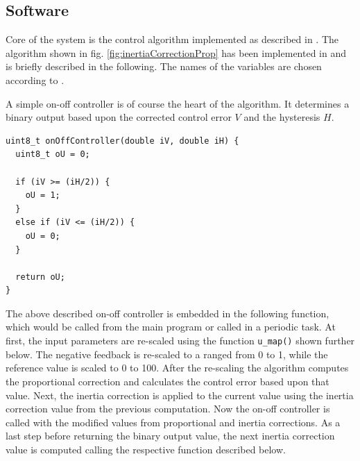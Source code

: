 \subsection{Software}
\label{subsec:etching_tank_sw}
Core of the system is the control algorithm implemented as described in \cite{article:onoffPLC}. The algorithm shown in fig. \ref{fig:inertiaCorrectionProp} has been implemented in  and is briefly described in the following. The names of the variables are chosen 
according to \cite{article:onoffPLC}.

A simple on-off controller is of course the heart of the algorithm. It determines a binary output based upon the corrected control error \(V\) and the hysteresis \(H\).

\begin{verbatim}
uint8_t onOffController(double iV, double iH) {
  uint8_t oU = 0;

  if (iV >= (iH/2)) {
    oU = 1;
  }
  else if (iV <= (iH/2)) {
    oU = 0;
  }

  return oU;
}
\end{verbatim}

The above described on-off controller is embedded in the following function, which would be called from the main program or called in a periodic task.
At first, the input parameters are re-scaled using the function \texttt{u\_map()} shown further below. The negative feedback is re-scaled to a ranged from 0 to 1, while the reference value is scaled to 0 to 100.
After the re-scaling the algorithm computes the proportional correction and calculates the control error based upon that value.
Next, the inertia correction is applied to the current value using the inertia correction value from the previous computation.
Now the on-off controller is called with the modified values from proportional and inertia corrections.
As a last step before returning the binary output value, the next inertia correction value is computed calling the respective function described below.

